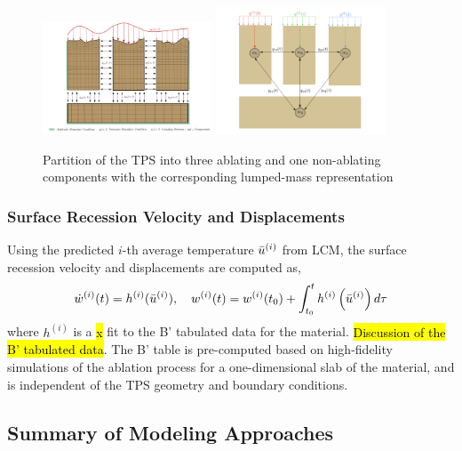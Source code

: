 \begin{figure}
    \centering
    \includegraphics[width=0.45\textwidth]{./figs/four_components.png}
    \includegraphics[width=0.45\textwidth]{./figs/lumped_mass_representation.png}
    \caption{Partition of the TPS into three ablating and one non-ablating components with the corresponding lumped-mass representation}
    \label{fig_four_components}
\end{figure}

\subsubsection{Surface Recession Velocity and Displacements}
Using the predicted $i$-th average temperature $\bar{u}^{(i)}$ from LCM, the surface recession velocity and displacements are computed as,
\begin{equation}
    \dot{w}^{(i)}(t) = h^{(i)}(\bar{u}^{(i)}),\quad w^{(i)}(t) = w^{(i)}(t_0) + \int_{t_0}^{t} h^{(i)}\left(\bar{u}^{(i)}\right)d\tau
\end{equation}
where $h^{(i)}$ is a \hl{x} fit to the B' tabulated data for the material. \hl{Discussion of the B' tabulated data}. The B' table is pre-computed based on high-fidelity simulations of the ablation process for a one-dimensional slab of the material, and is independent of the TPS geometry and boundary conditions.

\subsection{Summary of Modeling Approaches}

